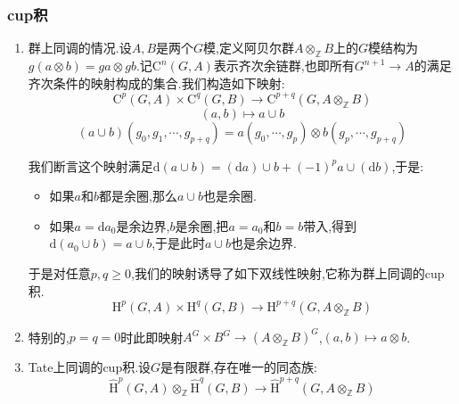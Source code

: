 \subsubsection{cup积}
\begin{enumerate}
	\item 群上同调的情况.设$A,B$是两个$G$模,定义阿贝尔群$A\otimes_{\mathbb{Z}}B$上的$G$模结构为$g(a\otimes b)=ga\otimes gb$.记$\mathrm{C}^n(G,A)$表示齐次余链群,也即所有$G^{n+1}\to A$的满足齐次条件的映射构成的集合.我们构造如下映射:
	$$\mathrm{C}^p(G,A)\times\mathrm{C}^q(G,B)\to\mathrm{C}^{p+q}(G,A\otimes_{\mathbb{Z}}B)$$
	$$(a,b)\mapsto a\cup b$$
	$$(a\cup b)(g_0,g_1,\cdots,g_{p+q})=a(g_0,\cdots,g_p)\otimes b(g_p,\cdots,g_{p+q})$$
	
	我们断言这个映射满足$\mathrm{d}(a\cup b)=(\mathrm{d}a)\cup b+(-1)^pa\cup (\mathrm{d}b)$,于是:
	\begin{itemize}
		\item 如果$a$和$b$都是余圈,那么$a\cup b$也是余圈.
		\item 如果$a=\mathrm{d}a_0$是余边界,$b$是余圈,把$a=a_0$和$b=b$带入,得到$\mathrm{d}(a_0\cup b)=a\cup b$,于是此时$a\cup b$也是余边界.
	\end{itemize}
	
	于是对任意$p,q\ge0$,我们的映射诱导了如下双线性映射,它称为群上同调的cup积.
	$$\mathrm{H}^p(G,A)\times\mathrm{H}^q(G,B)\to\mathrm{H}^{p+q}(G,A\otimes_{\mathbb{Z}}B)$$
	\item 特别的,$p=q=0$时此即映射$A^G\times B^G\to(A\otimes_{\mathbb{Z}}B)^G$,$(a,b)\mapsto a\otimes b$.
	\item Tate上同调的cup积.设$G$是有限群,存在唯一的同态族:
	$$\widehat{\mathrm{H}}^p(G,A)\otimes_{\mathbb{Z}}\widehat{\mathrm{H}}^q(G,B)\to\widehat{\mathrm{H}}^{p+q}(G,A\otimes_{\mathbb{Z}}B)$$
	

\end{enumerate}
